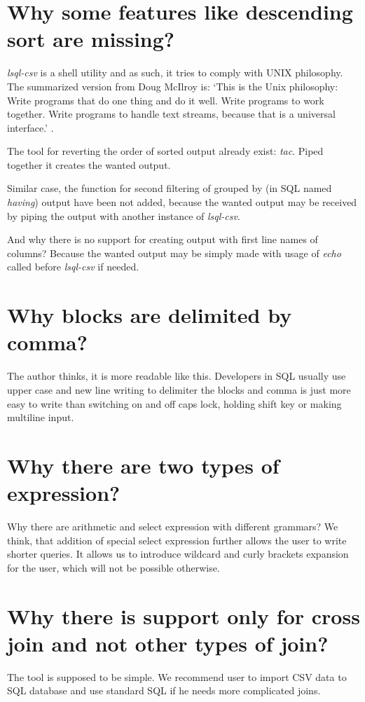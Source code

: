 \section{Why some features like descending sort are missing?}
\textit{lsql-csv} is a shell utility and as such, it tries to comply with UNIX philosophy. 
The summarized version from Doug McIlroy is: `This is the Unix philosophy: Write programs that do one thing and do it well. Write programs to work together. Write programs to handle text streams, because that is a universal interface.' \cite{unix-philosophy}.

The tool for reverting the order of sorted output already exist: \textit{tac}. Piped together it creates the wanted output.

Similar case, the function for second filtering of grouped by (in SQL named \textit{having}) 
output have been not added, because the wanted output
may be received by piping the output with another instance of \textit{lsql-csv}.

And why there is no support for creating output with first line names of columns? Because the wanted output
may be simply made with usage of \textit{echo} called before \textit{lsql-csv} if needed.

\section{Why blocks are delimited by comma?}
The author thinks, it is more readable like this. Developers in SQL usually use upper case and new line writing to delimiter the blocks and comma is just more easy to write than switching on and off caps lock, holding shift key or making multiline input.

\section{Why there are two types of expression?}
Why there are arithmetic and select expression with different grammars?
We think, that addition of special select expression further allows the user to write shorter queries.
It allows us to introduce wildcard and curly brackets expansion for the user, which will not be possible otherwise.

\section{Why there is support only for cross join and not other types of join?}
The tool is supposed to be simple. We recommend user to import CSV data to SQL database and use standard SQL if he needs more complicated joins.

